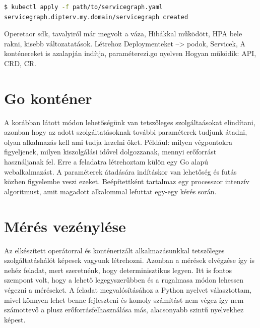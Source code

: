 \lstset{caption=Szolgáltatásháló indítása, label=servicegraph_apply}
\begin{lstlisting}[language=bash,morekeywords={kubectl, apply},alsoletter={-},breaklines=true]
$ kubectl apply -f path/to/servicegraph.yaml                          
servicegraph.dipterv.my.domain/servicegraph created 
\end{lstlisting}


Operetaor sdk, tavalyiról már megvolt a váza, Hibákkal működött, HPA bele rakni, kisebb változatatások. Létrehoz Deploymenteket --> podok, Servicek, 
A konténereket is azalapján indítja, paraméterezi.go nyelven
Hogyan működik: API, CRD, CR.

\section{Go konténer}
A korábban látott módon lehetőségünk van tetszőleges szolgáltaásokat elindítani, azonban hogy az adott szolgáltatásoknak további paraméterek tudjunk átadni, olyan alkalmazás kell ami tudja kezelni őket. Például: milyen végpontokra figyeljenek, milyen kiszolgálási idővel dolgozzanak, mennyi erőforrást használjanak fel. Erre a feladatra létrehoztam külön egy Go alapú webalkalmazást. 
A paraméterek átadására indításkor van lehetőség és futás közben figyelembe veszi ezeket. Beépítettként tartalmaz egy processzor intenzív algoritmust, amit magadott alkalommal lefuttat egy-egy kérés során. 


\section{Mérés vezénylése}
Az elkészített operátorral és konténerizált alkalmazásunkkal tetszőleges szolgáltatáshálót képesek vagyunk létrehozni.
Azonban a mérések elvégzése így is nehéz feladat, mert szeretnénk, hogy determinisztikus legyen. Itt is fontos szempont volt, hogy a lehető legegyszerűbben és a rugalmasa módon lehessen végezni a méréseket. 
A feladat megvalósításához a Python nyelvet választottam, mivel könnyen lehet benne fejleszteni és komoly számítást nem végez így nem számottevő a plusz erőforrásfelhasználása más, alacsonyabb szintű nyelvekhez képest. 

